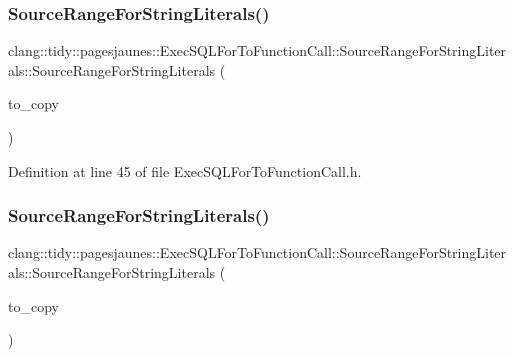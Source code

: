 \subsubsection{\texorpdfstring{Source\+Range\+For\+String\+Literals()}{SourceRangeForStringLiterals()}\hspace{0.1cm}{\footnotesize\ttfamily [4/6]}}
{\footnotesize\ttfamily clang\+::tidy\+::pagesjaunes\+::\+Exec\+S\+Q\+L\+For\+To\+Function\+Call\+::\+Source\+Range\+For\+String\+Literals\+::\+Source\+Range\+For\+String\+Literals (\begin{DoxyParamCaption}\item[{\hyperlink{classclang_1_1tidy_1_1pagesjaunes_1_1_exec_s_q_l_for_to_function_call_1_1_source_range_for_string_literals}{Source\+Range\+For\+String\+Literals} const \&}]{to\+\_\+copy }\end{DoxyParamCaption})\hspace{0.3cm}{\ttfamily [inline]}}



Definition at line 45 of file Exec\+S\+Q\+L\+For\+To\+Function\+Call.\+h.

\mbox{\label{classclang_1_1tidy_1_1pagesjaunes_1_1_exec_s_q_l_for_to_function_call_1_1_source_range_for_string_literals_ab73679c5c122d46d6d704860b01324a3}} 
\subsubsection{\texorpdfstring{Source\+Range\+For\+String\+Literals()}{SourceRangeForStringLiterals()}\hspace{0.1cm}{\footnotesize\ttfamily [5/6]}}
{\footnotesize\ttfamily clang\+::tidy\+::pagesjaunes\+::\+Exec\+S\+Q\+L\+For\+To\+Function\+Call\+::\+Source\+Range\+For\+String\+Literals\+::\+Source\+Range\+For\+String\+Literals (\begin{DoxyParamCaption}\item[{\hyperlink{classclang_1_1tidy_1_1pagesjaunes_1_1_exec_s_q_l_for_to_function_call_1_1_source_range_for_string_literals}{Source\+Range\+For\+String\+Literals} $\ast$}]{to\+\_\+copy }\end{DoxyParamCaption})\hspace{0.3cm}{\ttfamily [inline]}}



